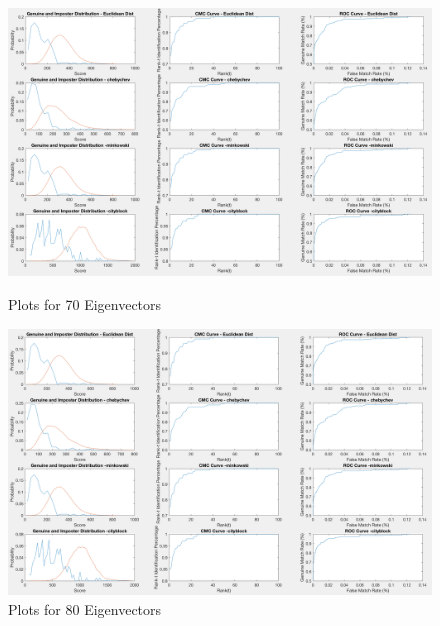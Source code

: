 \documentclass[10pt, letterpaper]{article}
\begin{document}
\begin{figure}
   \includegraphics[width=\linewidth]{images/for70coeff}
 \caption{ Plots for 70 Eigenvectors}
 \label{fig:70coeff}
 
   \includegraphics[width=\linewidth]{images/for80coeff}
 \caption{ Plots for 80 Eigenvectors}
 \label{fig:80coeff}
\end{figure}
\end{document}
